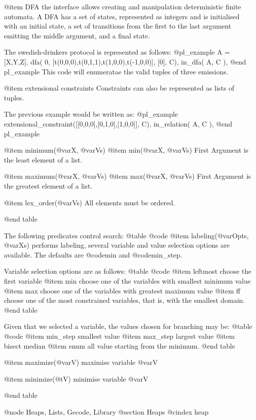 @item DFA
the interface allows creating and manipulation deterministic finite
automata. A DFA has a set of states, represented as integers
and is initialised with an initial state, a set of transitions from the
first to the last argument emitting the middle argument, and a final
state.

The swedish-drinkers protocol is represented as follows:
@pl_example
    A = [X,Y,Z],
    dfa( 0, [t(0,0,0),t(0,1,1),t(1,0,0),t(-1,0,0)], [0], C),
    in_dfa( A, C ),
@end pl_example
This code will enumeratae the valid tuples of three emissions.

@item extensional constraints
Constraints can also be represented as lists of tuples. 

The previous example
would be written as:
@pl_example
    extensional_constraint([[0,0,0],[0,1,0],[1,0,0]], C),
    in_relation( A, C ),
@end pl_example

@item minimum(@var{X}, @var{Vs})
@item min(@var{X}, @var{Vs})
First Argument is the least element of a list.

@item maximum(@var{X}, @var{Vs})
@item max(@var{X}, @var{Vs})
First Argument is the greatest element of a list.

@item lex_order(@var{Vs})
All elements must be ordered.

@end table

The following predicates control search:
@table @code
@item labeling(@var{Opts}, @var{Xs})
performs labeling, several variable and value selection options are
available. The defaults are @code{min} and @code{min_step}.

Variable selection options are as follows:
@table @code
@item leftmost
choose the first variable
@item min
choose one of the variables with smallest minimum value
@item max
choose one of the variables with greatest maximum value
@item ff
choose one of the most constrained variables, that is, with the smallest
domain.
@end table

Given that we selected a variable, the values chosen for branching may
be:
@table @code
@item min_step
smallest value
 @item max_step
 largest value
 @item bisect
 median
 @item enum
 all value starting from the minimum.
@end table


@item maximize(@var{V})
maximise variable @var{V}

@item minimize(@t{V}) 
minimise variable @var{V}

@end table



@node Heaps, Lists, Gecode, Library
@section Heaps
@cindex heap

